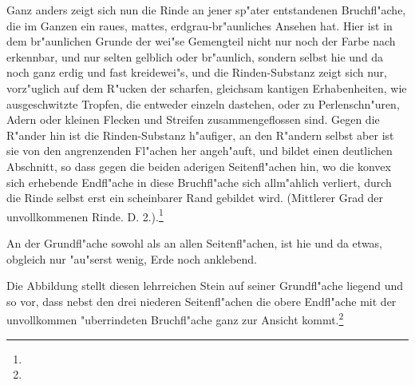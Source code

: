 \documentclass[a4paper, 11pt, oneside, german]{article}
\begin{document}
Ganz anders zeigt sich nun die Rinde an jener sp"ater entstandenen Bruchfl"ache, die im Ganzen ein raues, mattes, erdgrau-br"aunliches Ansehen hat. Hier ist in dem br"aunlichen Grunde der wei"se Gemengteil nicht nur noch der Farbe nach erkennbar, und nur selten gelblich oder br"aunlich, sondern selbst hie und da noch ganz erdig und fast kreidewei"s, und die Rinden-Substanz zeigt sich nur, vorz"uglich auf dem R"ucken der scharfen, gleichsam kantigen Erhabenheiten, wie ausgeschwitzte Tropfen, die entweder einzeln dastehen, oder zu Perlenschn"uren, Adern oder kleinen Flecken und Streifen zusammengeflossen sind. Gegen die R"ander hin ist die Rinden-Substanz h"aufiger, an den R"andern selbst aber ist sie von den angrenzenden Fl"achen her angeh"auft, und bildet einen deutlichen Abschnitt, so dass gegen die beiden aderigen Seitenfl"achen hin, wo die konvex sich erhebende Endfl"ache in diese Bruchfl"ache sich allm"ahlich verliert, durch die Rinde selbst erst ein scheinbarer Rand gebildet wird. (Mittlerer Grad der unvollkommenen Rinde. D. 2.).\footnote{}

An der Grundfl"ache sowohl als an allen Seitenfl"achen, ist hie und da etwas, obgleich nur "au"serst wenig, Erde noch anklebend.

Die Abbildung stellt diesen lehrreichen Stein auf seiner Grundfl"ache liegend und so vor, dass nebst den drei niederen Seitenfl"achen die obere Endfl"ache mit der unvollkommen "uberrindeten Bruchfl"ache ganz zur Ansicht kommt.\footnote{}
\end{document}
